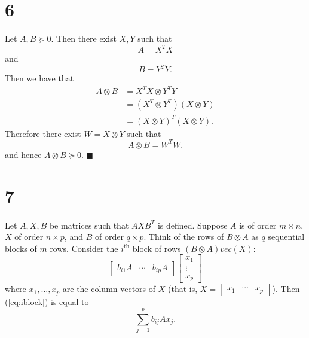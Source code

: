 \documentclass[letterpaper,12pt,oneside,onecolumn]{article}
\begin{document}
\section*{6}
\paragraph{}
Let $A, B \succcurlyeq 0$. Then there exist $X, Y$ such that $$A = X^TX$$ and $$B = Y^TY.$$
Then we have that
\begin{align*}
A \otimes B &= X^TX \otimes Y^TY \\
&= (X^T \otimes Y^T)(X \otimes Y) \\
&= (X \otimes Y)^T(X \otimes Y).
\end{align*}
Therefore  there exist $W = X \otimes Y$ such that $$A \otimes B = W^TW.$$
and hence $A \otimes B \succcurlyeq 0$. $\blacksquare$
\section*{7}
\paragraph{}
Let $A, X, B$ be matrices such that $AXB^T$ is defined. Suppose $A$ is  of order $m \times n$, $X$ of order $n \times p$, and $B$ of order $q \times p$. Think of the rows of $B \otimes A$ as $q$ sequential blocks of $m$ rows. Consider the $i^\text{th}$ block of rows $(B \otimes A)vec(X)$:
\begin{equation}\begin{bmatrix} b_{i1} A & \cdots & b_{ip}A \end{bmatrix}
\begin{bmatrix}
x_1 \\ \vdots \\ x_p
\end{bmatrix} \label{eq:iblock}\end{equation}
where $x_1, \dots, x_p$ are the column vectors of $X$ (that is, $X = \begin{bmatrix} x_1 & \cdots & x_p\end{bmatrix}$). Then (\ref{eq:iblock}) is equal to
\begin{equation} \sum_{j=1}^p b_{ij}Ax_j.  \label{eq:tensorsum}\end{equation}
\end{document}
